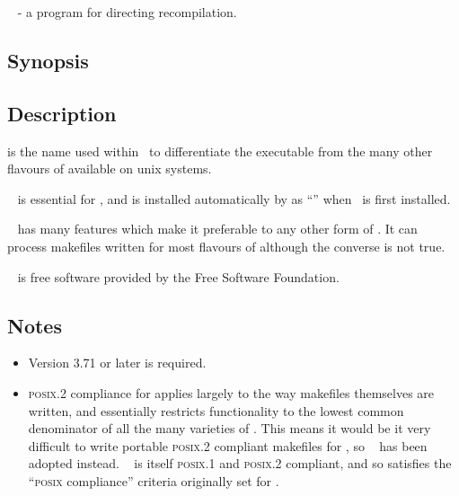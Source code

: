 \gnu\  - a program for directing recompilation.

\subsection*{Synopsis}

\begin{synopsis}
\end{synopsis}

\subsection*{Description}

 is the name used within \aipspp\ to differentiate the \gnu
{} executable from the many other flavours of  available
on unix systems.

\gnu\  is essential for \aipspp, and is installed automatically
by  as ``'' when \aipspp\ is first installed.

\gnu\  has many features which make it preferable to any other
form of .  It can process makefiles written for most flavours of
 although the converse is not true.

\gnu\  is free software provided by the Free Software
Foundation.

\subsection*{Notes}

\begin{itemize}
\item
   Version 3.71 or later is required.

\item
   \textsc{posix.2} compliance for  applies largely to the way
   makefiles themselves are written, and essentially restricts functionality
   to the lowest common denominator of all the many varieties of
   .  This means it would be it very difficult to write portable
   \textsc{posix.2} compliant makefiles for \aipspp, so \gnu\  has
   been adopted instead.  \gnu\  is itself \textsc{posix.1} and
   \textsc{posix.2} compliant, and so satisfies the ``\textsc{posix}
   compliance'' criteria originally set for \aipspp.
\end{itemize}

